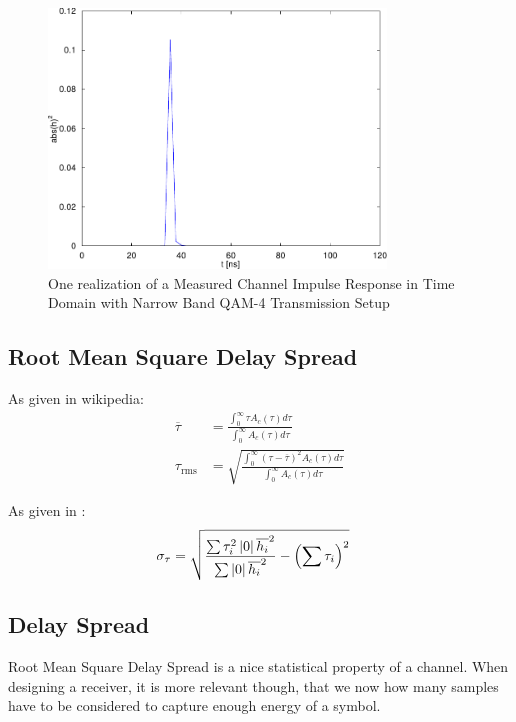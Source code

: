 \begin{figure}[p]
  \centering
  \includegraphics[width=0.8\textwidth]{figures/matlab/res_450_qam4_h}
  \caption{One realization of a Measured Channel Impulse Response in Time Domain
    with Narrow Band \gls{QAM}-4 Transmission Setup}
  \label{fig:res_450_qam4_h}
\end{figure}

\subsection{Root Mean Square Delay Spread}
As given in wikipedia:
\begin{align}
  \overline{\tau} &=\frac{\int_0^\infty\tau A_c(\tau)d\tau}{\int_0^\infty A_c(\tau)d\tau} \\
  \tau_{\text{rms}} &=\sqrt{\frac{\int_0^\infty(\tau-\overline{\tau})^2
      A_c(\tau)d\tau}{\int_0^\infty A_c(\tau)d\tau}}
\end{align}

As given in \cite{burg_wr1}:
\begin{align}
  \sigma_\tau &= \sqrt{
    \frac{\sum \tau_i^2 \abs{\overline{h_i}}^2}
         {\sum \abs{\overline{h_i}}^2}
         - \left(\sum \tau_i \right)^2
  }
\end{align}


\subsection{Delay Spread}
Root Mean Square Delay Spread is a nice statistical property of a channel.
When designing a receiver, it is more relevant though, that we now how many
samples have to be considered to capture enough energy of a symbol. \\

